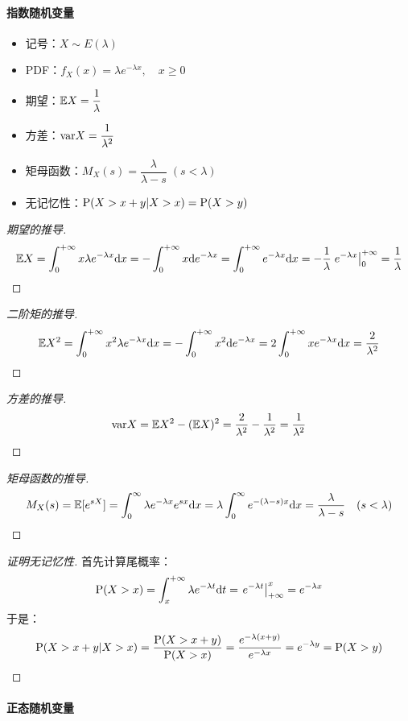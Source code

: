\paragraph{指数随机变量}

\begin{itemize}[itemsep=1ex]
    \item 记号：$X\sim E(\lambda)$
    \item PDF：$f_X(x)=\lambda e^{-\lambda x},\quad x\geqslant0$
    \item 期望：$\mathbb{E} X=\dfrac{1}{\lambda}$
    \item 方差：$\mathrm{var} X=\dfrac{1}{\lambda^2}$
    \item 矩母函数：$M_X(s)=\dfrac{\lambda}{\lambda-s}\;(s<\lambda)$
    \item 无记忆性：$\mathrm{P}(X>x+y\vert X>x)=\mathrm{P}(X>y)$
\end{itemize}

\begin{proof}[期望的推导]
\[
\mathbb{E} X=\int_0^{+\infty}x\lambda e^{-\lambda x}\mathrm dx=-\int_0^{+\infty}x\mathrm d e^{-\lambda x}=\int_0^{+\infty}e^{-\lambda x}\mathrm dx=-\frac{1}{\lambda}\left.e^{-\lambda x}\right|_{0}^{+\infty}=\frac{1}{\lambda}
\]
\end{proof}
\begin{proof}[二阶矩的推导]
\[
\mathbb{E} X^2=\int_0^{+\infty} x^2\lambda e^{-\lambda x}\mathrm dx=-\int_0^{+\infty}x^2\mathrm de^{-\lambda x}=2\int_0^{+\infty}x e^{-\lambda x}\mathrm dx=\frac{2}{\lambda^2}
\]
\end{proof}
\begin{proof}[方差的推导]
\[
\mathrm{var} X=\mathbb{E} X^2-(\mathbb{E} X)^2=\frac{2}{\lambda^2}-\frac{1}{\lambda^2}=\frac{1}{\lambda^2}
\]
\end{proof}
\begin{proof}[矩母函数的推导]
\[
M_X(s)=\mathbb{E}[e^{sX}]=\int_0^\infty\lambda e^{-\lambda x}e^{sx}\mathrm dx=\lambda\int_0^\infty e^{-(\lambda-s)x}\mathrm dx=\frac{\lambda}{\lambda-s}\quad(s<\lambda)
\]
\end{proof}
\begin{proof}[证明无记忆性]
首先计算尾概率：
\[
\mathrm{P}(X>x)=\int_x^{+\infty}\lambda e^{-\lambda t}\mathrm dt=\left.e^{-\lambda t}\right|_{+\infty}^x=e^{-\lambda x}
\]
于是：
\[
\mathrm{P}(X>x+y\vert X>x)=\frac{\mathrm{P}(X>x+y)}{\mathrm{P}(X>x)}=\frac{e^{-\lambda(x+y)}}{e^{-\lambda x}}=e^{-\lambda y}=\mathrm{P}(X>y)
\]
\end{proof}

\paragraph{正态随机变量}

